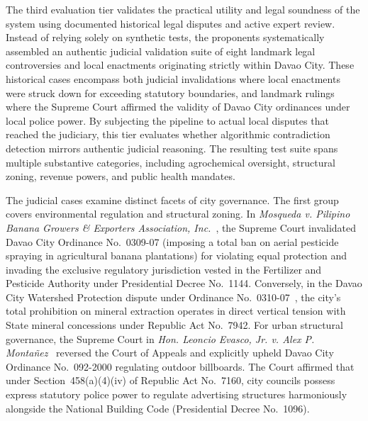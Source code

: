     The third evaluation tier validates the practical utility and legal soundness of the system using documented historical legal disputes and active expert review. Instead of relying solely on synthetic tests, the proponents systematically assembled an authentic judicial validation suite of eight landmark legal controversies and local enactments originating strictly within Davao City. These historical cases encompass both judicial invalidations where local enactments were struck down for exceeding statutory boundaries, and landmark rulings where the Supreme Court affirmed the validity of Davao City ordinances under local police power. By subjecting the pipeline to actual local disputes that reached the judiciary, this tier evaluates whether algorithmic contradiction detection mirrors authentic judicial reasoning. The resulting test suite spans multiple substantive categories, including agrochemical oversight, structural zoning, revenue powers, and public health mandates.

    The judicial cases examine distinct facets of city governance. The first group covers environmental regulation and structural zoning. In \textit{Mosqueda v. Pilipino Banana Growers \& Exporters Association, Inc.}~\cite{scp2016mosqueda}, the Supreme Court invalidated Davao City Ordinance No.~0309-07 (imposing a total ban on aerial pesticide spraying in agricultural banana plantations) for violating equal protection and invading the exclusive regulatory jurisdiction vested in the Fertilizer and Pesticide Authority under Presidential Decree No.~1144. Conversely, in the Davao City Watershed Protection dispute under Ordinance No.~0310-07~\cite{spdavao2007ord0310}, the city's total prohibition on mineral extraction operates in direct vertical tension with State mineral concessions under Republic Act No.~7942. For urban structural governance, the Supreme Court in \textit{Hon. Leoncio Evasco, Jr. v. Alex P. Monta{\~n}ez}~\cite{scp2018evascovmontanez} reversed the Court of Appeals and explicitly upheld Davao City Ordinance No.~092-2000 regulating outdoor billboards. The Court affirmed that under Section~458(a)(4)(iv) of Republic Act No.~7160, city councils possess express statutory police power to regulate advertising structures harmoniously alongside the National Building Code (Presidential Decree No.~1096).

